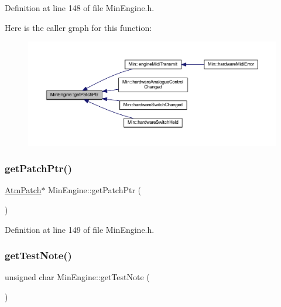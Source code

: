 Definition at line 148 of file Min\+Engine.\+h.

Here is the caller graph for this function\+:
\nopagebreak
\begin{figure}[H]
\begin{center}
\leavevmode
\includegraphics[width=350pt]{d4/d0f/class_min_engine_a800de17fbe50c5f2aceab2999f3b8be1_icgraph}
\end{center}
\end{figure}
\mbox{\label{class_min_engine_ae8bf10e7e525b7474aa5b5f9a4aee7d9}} 
\subsubsection{\texorpdfstring{get\+Patch\+Ptr()}{getPatchPtr()}\hspace{0.1cm}{\footnotesize\ttfamily [2/2]}}
{\footnotesize\ttfamily \hyperlink{class_atm_patch}{Atm\+Patch}$\ast$ Min\+Engine\+::get\+Patch\+Ptr (\begin{DoxyParamCaption}{ }\end{DoxyParamCaption})\hspace{0.3cm}{\ttfamily [inline]}}



Definition at line 149 of file Min\+Engine.\+h.

\mbox{\label{class_min_engine_a461861aff0eb8271558c9c20bc040b56}} 
\subsubsection{\texorpdfstring{get\+Test\+Note()}{getTestNote()}}
{\footnotesize\ttfamily unsigned char Min\+Engine\+::get\+Test\+Note (\begin{DoxyParamCaption}{ }\end{DoxyParamCaption})\hspace{0.3cm}{\ttfamily [inline]}}




